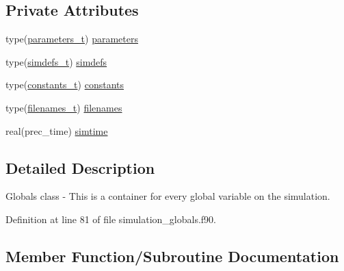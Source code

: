 \subsection*{Private Attributes}
\begin{DoxyCompactItemize}
\item 
type(\mbox{\hyperlink{structsimulation__globals__mod_1_1parameters__t}{parameters\+\_\+t}}) \mbox{\hyperlink{structsimulation__globals__mod_1_1globals__class_aef60024afa0a128d0af3d8a47a732657}{parameters}}
\item 
type(\mbox{\hyperlink{structsimulation__globals__mod_1_1simdefs__t}{simdefs\+\_\+t}}) \mbox{\hyperlink{structsimulation__globals__mod_1_1globals__class_aa066434c9dc6147331dce613422568ae}{simdefs}}
\item 
type(\mbox{\hyperlink{structsimulation__globals__mod_1_1constants__t}{constants\+\_\+t}}) \mbox{\hyperlink{structsimulation__globals__mod_1_1globals__class_af178aeb39fefa2c7dec6a74faa04819c}{constants}}
\item 
type(\mbox{\hyperlink{structsimulation__globals__mod_1_1filenames__t}{filenames\+\_\+t}}) \mbox{\hyperlink{structsimulation__globals__mod_1_1globals__class_abb5045218897afcf2ccc51f63dc38761}{filenames}}
\item 
real(prec\+\_\+time) \mbox{\hyperlink{structsimulation__globals__mod_1_1globals__class_ab28ea8e0cca87c11a33e4acfb3d3b293}{simtime}}
\end{DoxyCompactItemize}


\subsection{Detailed Description}
Globals class -\/ This is a container for every global variable on the simulation. 

Definition at line 81 of file simulation\+\_\+globals.\+f90.



\subsection{Member Function/\+Subroutine Documentation}
\mbox{\label{structsimulation__globals__mod_1_1globals__class_a9438f8bdec469e7cbf9b898a398f9745}} 
